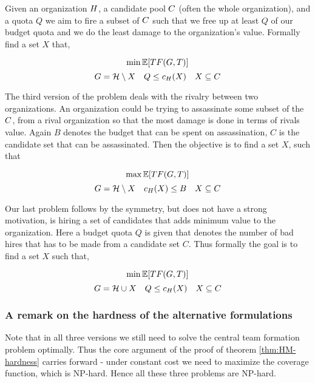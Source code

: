 Given an organization ${H}$, a candidate pool ${C}$ (often the whole organization), and a quota $Q$ we aim to fire a subset  of ${C}$ such that we free up at least $Q$ of our budget quota and we do the least damage to the organization's value. Formally find a set $X$ that, 

$$ \min \mathbb{E}[TF(G,T)] $$
$$ G = \mathcal{H} \setminus X \quad Q \le c_H(X) \quad  X \subseteq C $$

The third version of the problem deals with the rivalry between two organizations. An organization could be trying to assassinate some subset of the ${C}$, from a rival organization so that the most damage is done in terms of rivals value. Again $B$ denotes the budget that can be spent on assassination, $C$ is the candidate set that can be assassinated. Then the objective is to find a set $X$, such that

$$ \max \mathbb{E}[TF(G,T)] $$
$$ G = \mathcal{H} \setminus X \quad c_H(X) \le B \quad  X \subseteq C $$

Our last problem follows by the symmetry, but does not have a strong motivation, is hiring a set of candidates that adds minimum value to the organization. Here a budget quota $Q$ is given that denotes the number of bad hires that has to be made from a candidate set $C$. Thus formally the goal is to find a set $X$ such that,

$$ \min \mathbb{E}[TF(G,T)] $$
$$ G = \mathcal{H} \cup X \quad Q \le c_H(X) \quad  X \subseteq C $$

\subsubsection{A remark on the hardness of the alternative formulations}

Note that in all three versions we still need to solve the central team formation problem optimally. Thus the core argument of  the proof of theorem \ref{thm:HM-hardness} carries forward - under constant cost we need to maximize the coverage function, which is NP-hard. Hence all these three problems are NP-hard.